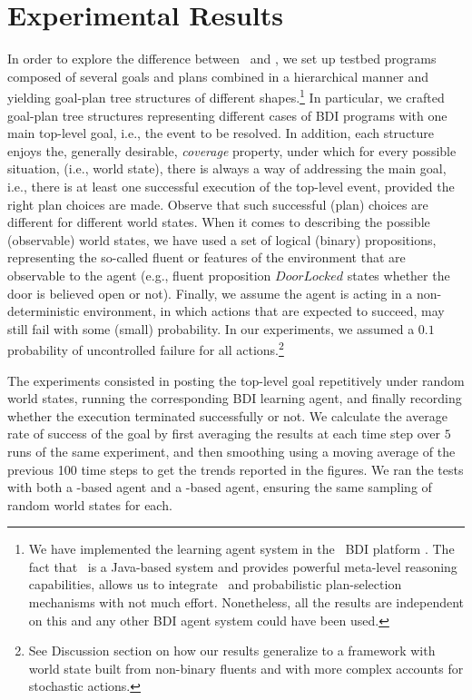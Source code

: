 \section{Experimental Results}\label{sec:experiments}

In order to explore the difference between \BUL\ and \CL, we set up testbed
programs composed of several goals and plans combined in a hierarchical manner
and yielding goal-plan tree structures of different shapes.\footnote{We have
implemented the learning agent system in the \JACK\ BDI platform
\cite{Busetta99jack}. The fact that \JACK\ is a Java-based system and
provides powerful meta-level reasoning capabilities, allows us to integrate \weka\ and
probabilistic plan-selection mechanisms with not much effort. Nonetheless, all
the results are independent on this and any other BDI agent system could
have been used.}
In particular, we crafted goal-plan tree structures representing different
cases of BDI programs with one main top-level goal, i.e., the event to
be resolved. In addition, each structure enjoys the, generally desirable,
\emph{coverage} property, under which for every possible situation, (i.e., world
state), there is always a way of addressing the main goal, i.e., there is at
least one successful execution of the top-level event, provided the right plan
choices are made. Observe that such successful (plan) choices are different
for different world states.
When it comes to describing the possible (observable) world states, we have used
a set of logical (binary) propositions, representing the so-called fluent or
features of the environment that are observable to the agent (e.g., fluent
proposition $\mathit{DoorLocked}$ states whether the door is believed open or
not).
Finally, we assume the agent is acting in a non-deterministic environment, in
which actions that are expected to succeed, may still fail with some (small)
probability. In our experiments, we assumed a $0.1$ probability of
uncontrolled failure for all actions.\footnote{See Discussion section on how our
results generalize to a framework with world state built from non-binary fluents
and with more complex accounts for stochastic actions.}




The experiments consisted in posting the top-level goal repetitively under random
world states, running the corresponding  BDI learning agent, and finally
recording whether the execution terminated successfully or not.
We calculate the average rate of success of the goal by first averaging the results at each time step over $5$ runs of the same experiment, and then smoothing using a moving average of the previous 100 time steps to get the trends reported in the figures.
We ran the tests with both a \BUL-based agent and a \CL-based agent,
ensuring the same sampling of random world states for each.

